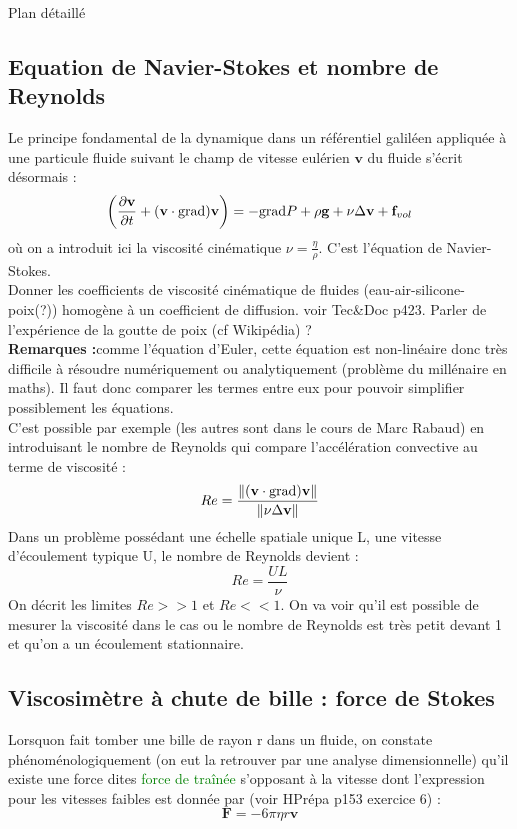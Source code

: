 \begin{reportBlock}{Plan détaillé}
  \subsection{Equation de Navier-Stokes et nombre de Reynolds}
  Le principe fondamental de la dynamique dans un référentiel galiléen appliquée à une particule fluide suivant le champ de vitesse eulérien $\mathbf{v}$ du fluide s'écrit désormais :
  \begin{equation}
      \left(\frac{\partial \mathbf{v}}{\partial t} + (\mathbf{v}\cdot\mathbf{\mathrm{grad}})\mathbf{v}\right) = -\mathbf{\mathrm{grad}} P + \rho \mathbf{g} + \nu\Delta\mathbf{v} + \mathbf{f}_{vol}
  \end{equation}
  où on a introduit ici la viscosité cinématique $\nu=\frac{\eta}{\rho}$. C'est l'équation de Navier-Stokes.\\
  Donner les coefficients de viscosité cinématique de fluides (eau-air-silicone-poix(?)) homogène à un coefficient de diffusion. voir Tec\&Doc p423. Parler de l'expérience de la goutte de poix (cf Wikipédia) ?\\
  
  \textbf{Remarques :}comme l'équation d'Euler, cette équation est non-linéaire donc très difficile à résoudre numériquement ou analytiquement (problème du millénaire en maths). Il faut donc comparer les termes entre eux pour pouvoir simplifier possiblement les équations.\\
  
  C'est possible par exemple (les autres sont dans le cours de Marc Rabaud) en introduisant le nombre de Reynolds qui compare l'accélération convective au terme de viscosité :
  \begin{equation}
      Re = \frac{\lVert (\mathbf{v}\cdot\mathbf{\mathrm{grad}})\mathbf{v}\rVert}{\lVert\nu\Delta\mathbf{v}\rVert}
  \end{equation}
  Dans un problème possédant une échelle spatiale unique L, une vitesse d'écoulement typique U, le nombre de Reynolds devient :
  \begin{equation}
      Re = \frac{UL}{\nu}
  \end{equation}
  On décrit les limites $Re>>1$ et $Re<<1$. On va voir qu'il est possible de mesurer la viscosité dans le cas ou le nombre de Reynolds est très petit devant 1 et qu'on a un écoulement stationnaire.
  
  \subsection{Viscosimètre à chute de bille : force de Stokes}
  Lorsquon fait tomber une bille de rayon r dans un fluide, on constate phénoménologiquement (on eut la retrouver par une analyse dimensionnelle) qu'il existe une force dites \textcolor{green}{force de traînée} s'opposant à la vitesse dont l'expression pour les vitesses faibles est donnée par (voir HPrépa p153 exercice 6) :
  \begin{equation}
      \mathbf{F} = -6\pi\eta r\mathbf{v}
  \end{equation}
  

\end{reportBlock}
